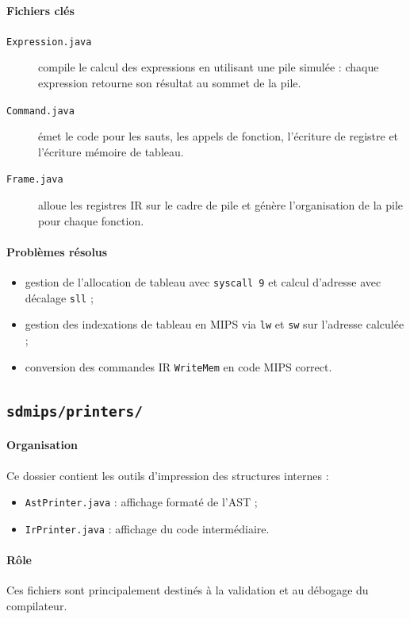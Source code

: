 \documentclass[a4paper,11pt]{article}
\begin{document}
\paragraph{Fichiers clés}
\begin{description}
  \item[\texttt{Expression.java}] compile le calcul des expressions en utilisant une pile simulée : chaque expression retourne son résultat au sommet de la pile.
  \item[\texttt{Command.java}] émet le code pour les sauts, les appels de fonction, l'écriture de registre et l'écriture mémoire de tableau.
  \item[\texttt{Frame.java}] alloue les registres IR sur le cadre de pile et génère l'organisation de la pile pour chaque fonction.
\end{description}

\paragraph{Problèmes résolus}
\begin{itemize}
  \item gestion de l'allocation de tableau avec \texttt{syscall 9} et calcul d'adresse avec décalage \texttt{sll} ;
  \item gestion des indexations de tableau en MIPS via \texttt{lw} et \texttt{sw} sur l'adresse calculée ;
  \item conversion des commandes IR \texttt{WriteMem} en code MIPS correct.
\end{itemize}

\subsection{\texttt{sdmips/printers/}}
\paragraph{Organisation}
Ce dossier contient les outils d'impression des structures internes :
\begin{itemize}
  \item \texttt{AstPrinter.java} : affichage formaté de l'AST ;
  \item \texttt{IrPrinter.java} : affichage du code intermédiaire.
\end{itemize}

\paragraph{Rôle}
Ces fichiers sont principalement destinés à la validation et au débogage du compilateur.
\end{document}
